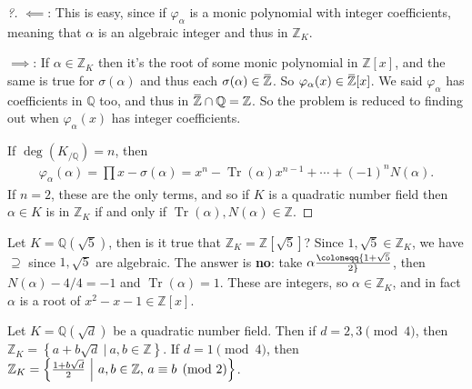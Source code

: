 \begin{proof}[?]

\(\impliedby\): This is easy, since if \(\varphi_\alpha\) is a monic
polynomial with integer coefficients, meaning that \(\alpha\) is an
algebraic integer and thus in \({\mathbb{Z}}_K\).

\(\implies\): If \(\alpha \in {\mathbb{Z}}_K\) then it's the root of
some monic polynomial in \({\mathbb{Z}}[x]\), and the same is true for
\(\sigma(\alpha)\) and thus each
\(\sigma(\alpha) \in \mkern 1.5mu\overline{\mkern-1.5mu{\mathbb{Z}}\mkern-1.5mu}\mkern 1.5mu\).
So
\(\varphi_{ \alpha}(x) \in \mkern 1.5mu\overline{\mkern-1.5mu{\mathbb{Z}}\mkern-1.5mu}\mkern 1.5mu[x]\).
We said \(\varphi_{ \alpha}\) has coefficients in \({\mathbb{Q}}\) too,
and thus in
\(\mkern 1.5mu\overline{\mkern-1.5mu{\mathbb{Z}}\mkern-1.5mu}\mkern 1.5mu\cap{\mathbb{Q}}= {\mathbb{Z}}\).
So the problem is reduced to finding out when \(\varphi_{\alpha}(x)\)
has integer coefficients.

If \(\deg(K_{/{\mathbb{Q}}}) = n\), then
\begin{align*}
\varphi_{ \alpha}( \alpha) = \prod x- \sigma(\alpha) = x^n - \operatorname{Tr}(\alpha)x^{n-1} + \cdots + (-1)^n N( \alpha)
.\end{align*}
If \(n=2\), these are the only terms, and so if \(K\) is a quadratic
number field then \(\alpha\in K\) is in \({\mathbb{Z}}_K\) if and only
if \(\operatorname{Tr}( \alpha), N(\alpha) \in {\mathbb{Z}}\).

\end{proof}

\begin{example}[?]

Let \(K = {\mathbb{Q}}( \sqrt{5} )\), then is it true that
\({\mathbb{Z}}_K = {\mathbb{Z}}[\sqrt{5} ]\)? Since
\(1, \sqrt{5} \in {\mathbb{Z}}_K\), we have \(\supseteq\) since
\(1, \sqrt{5}\) are algebraic. The answer is \textbf{no}: take
\(\alpha\coloneqq{1 + \sqrt{5} \over 2}\), then \(N( \alpha) -4/4 = -1\)
and \(\operatorname{Tr}( \alpha) = 1\). These are integers, so
\(\alpha\in {\mathbb{Z}}_K\), and in fact \(\alpha\) is a root of
\(x^2 - x - 1 \in {\mathbb{Z}}[x]\).

\end{example}

\begin{theorem}[?]

Let \(K = {\mathbb{Q}}( \sqrt{d} )\) be a quadratic number field. Then
if \(d = 2,3 \pmod 4\), then
\({\mathbb{Z}}_K = \left\{{ a + b \sqrt{d} {~\mathrel{\Big|}~}a, b\in {\mathbb{Z}}}\right\}\).
If \(d=1 \pmod 4\), then
\({\mathbb{Z}}_K = \left\{{ {1 + b \sqrt{d} \over 2} {~\mathrel{\Big|}~}a,b\in {\mathbb{Z}},\, a\equiv b \pmod 2}\right\}\).

\end{theorem}

